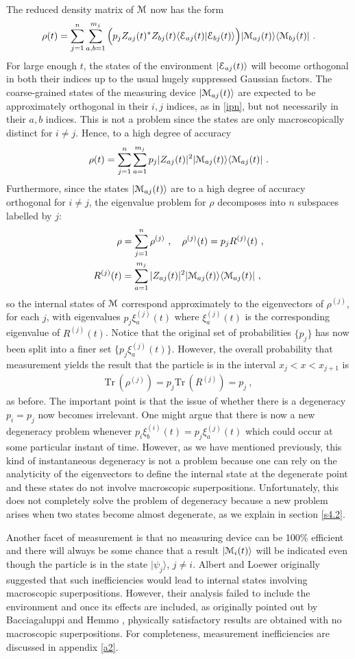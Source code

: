 \documentclass[12pt]{article}
\def\BM{{\EuScript M}}
\def\BE{{\EuScript E}}
\def\bra#1{\langle #1|}
\def\ket#1{| #1\rangle}
\def\braket#1#2{\VEV{#1 | #2}}
\def\VEV#1{\langle #1\rangle}
\newcommand{\EQ}[1]{\begin{equation}\begin{split} #1
\end{split}\end{equation}}
\begin{document}
The reduced density matrix of $\BM$ now has the form
\EQ{
\rho(t)=\sum_{j=1}^n\sum_{a,b=1}^{m_j}\Big(p_jZ_{aj}(t)^*Z_{bj}(t)\braket{\BE_{aj}(t)}{\BE_{bj}(t)}\Big)\ket{\BM_{aj}(t)}\bra{\BM_{bj}(t)}\ .
}
For large enough $t$, the states of the environment $\ket{\BE_{aj}(t)}$ will become orthogonal in both their indices up to the usual hugely suppressed Gaussian factors. 
The coarse-grained states of the measuring device $\ket{\BM_{aj}(t)}$ are expected to be approximately orthogonal in their $i,j$ indices, as in \eqref{ipn}, but not necessarily in their $a,b$ indices. This is not a problem since the states are only macroscopically distinct for $i\neq j$. Hence, to a high degree of accuracy 
\EQ{
\rho(t)=\sum_{j=1}^n\sum_{a=1}^{m_j}p_j|Z_{aj}(t)|^2\ket{\BM_{aj}(t)}\bra{\BM_{aj}(t)}\ .
}
Furthermore, since the states $\ket{\BM_{aj}(t)}$ are to a high degree of accuracy orthogonal for $i\neq j$, the eigenvalue problem for $\rho$ decomposes into $n$ subspaces labelled by $j$:
\EQ{
\rho&=\sum_{j=1}^n\rho^{(j)}\ ,\quad
\rho^{(j)}(t)=p_jR^{(j)}(t)\ ,\\ R^{(j)}(t)&=\sum_{a=1}^{m_j}|Z_{aj}(t)|^2\ket{\BM_{aj}(t)}\bra{\BM_{aj}(t)}\ ,
}
so the internal states of $\BM$ correspond approximately to the 
eigenvectors of $\rho^{(j)}$, for each $j$, with eigenvalues $p_j\xi^{(j)}_a(t)$ where $\xi^{(j)}_a(t)$ is the corresponding eigenvalue of $R^{(j)}(t)$.
Notice that  the original set of probabilities $\{p_j\}$ has now been split into a finer set $\{p_j\xi^{(j)}_{a}(t)\}$. However, the overall probability that measurement yields the result that the particle is in the interval $x_j<x<x_{j+1}$ is 
\EQ{
\text{Tr}\,(\rho^{(j)})=p_j\text{Tr}\,(R^{(j)})=p_j\ ,
}
as before. The important point is that the issue of whether there is a degeneracy $p_i=p_j$ now becomes irrelevant. One might argue that there is now a new degeneracy problem whenever $p_i\xi^{(i)}_b(t)=p_j\xi_a^{(j)}(t)$ which could occur at some particular instant of time. However, as we have mentioned previously, this kind of instantaneous degeneracy is not a problem because one can rely on the analyticity of the eigenvectors to define the internal state at the degenerate point and these states do not involve macroscopic superpositions.
Unfortunately, this does not completely solve the problem of degeneracy because a new problem arises when two states become almost degenerate, as we explain in section \ref{s4.2}.

Another facet of measurement is that no measuring device can be 100\% efficient and there will always be some chance that a result $\ket{\BM_i(t)}$ will be indicated even though the particle is in the state $\ket{\psi_j}$, $j\neq i$. 
Albert and Loewer \cite{AL1} originally suggested that such inefficiencies would lead to internal states involving macroscopic superpositions. However, their analysis failed to include the environment and once its effects are included, as originally pointed out by Bacciagaluppi and Hemmo \cite{BH1},  physically satisfactory results are obtained with no macroscopic superpositions. For completeness, measurement inefficiencies are discussed in appendix \ref{a2}.
\end{document}
